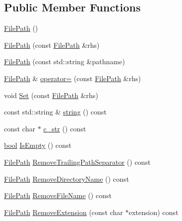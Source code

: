\subsection*{Public Member Functions}
\begin{DoxyCompactItemize}
\item 
\hyperlink{classtesting_1_1internal_1_1FilePath_a3504a51accbca78a52fe586133ea5499}{File\+Path} ()
\item 
\hyperlink{classtesting_1_1internal_1_1FilePath_ae9efd0fee56c6e3e2d659b464250b112}{File\+Path} (const \hyperlink{classtesting_1_1internal_1_1FilePath}{File\+Path} \&rhs)
\item 
\hyperlink{classtesting_1_1internal_1_1FilePath_a9fc072b140aa0652a7022fb809fe3abe}{File\+Path} (const std\+::string \&pathname)
\item 
\hyperlink{classtesting_1_1internal_1_1FilePath}{File\+Path} \& \hyperlink{classtesting_1_1internal_1_1FilePath_a8d9c1bafb90f10bcd5611a54d8f326ef}{operator=} (const \hyperlink{classtesting_1_1internal_1_1FilePath}{File\+Path} \&rhs)
\item 
void \hyperlink{classtesting_1_1internal_1_1FilePath_a15a42de7518e89254e0640dd9317d5f7}{Set} (const \hyperlink{classtesting_1_1internal_1_1FilePath}{File\+Path} \&rhs)
\item 
const std\+::string \& \hyperlink{classtesting_1_1internal_1_1FilePath_ab1d58734f2e179264eb6353fea57361d}{string} () const
\item 
const char $\ast$ \hyperlink{classtesting_1_1internal_1_1FilePath_a43e9ff978b0d7c43c401d976d4621aa3}{c\+\_\+str} () const
\item 
\hyperlink{classbool}{bool} \hyperlink{classtesting_1_1internal_1_1FilePath_a2c165c5510e8705ade547849a9234a6e}{Is\+Empty} () const
\item 
\hyperlink{classtesting_1_1internal_1_1FilePath}{File\+Path} \hyperlink{classtesting_1_1internal_1_1FilePath_ab47ada111cc940cf2359f6533bada6ca}{Remove\+Trailing\+Path\+Separator} () const
\item 
\hyperlink{classtesting_1_1internal_1_1FilePath}{File\+Path} \hyperlink{classtesting_1_1internal_1_1FilePath_a6b61ede2c81ecd870b8220c04aec3060}{Remove\+Directory\+Name} () const
\item 
\hyperlink{classtesting_1_1internal_1_1FilePath}{File\+Path} \hyperlink{classtesting_1_1internal_1_1FilePath_a49e030b5a62ca7dcc7f920a63a96fa55}{Remove\+File\+Name} () const
\item 
\hyperlink{classtesting_1_1internal_1_1FilePath}{File\+Path} \hyperlink{classtesting_1_1internal_1_1FilePath_aab20b631705b90044d04c67205f2256f}{Remove\+Extension} (const char $\ast$extension) const

\end{DoxyCompactItemize}
